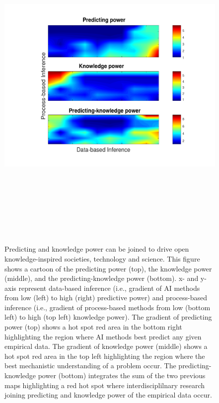 \documentclass[english,12pt]{article}
\begin{document}
\newpage


\begin{figure}
\begin{center}
  \hspace{-0.5 in}\includegraphics[width=16cm,height=16cm]{Figure3.pdf}\\
\end{center}
\vspace{-0.25 in}
\caption{Predicting and knowledge power can be joined to drive open
  knowledge-inspired societies, technology and science. This figure
  shows a cartoon of the predicting power (top), the knowledge power
  (middle), and the predicting-knowledge power (bottom). x- and y-axis
  represent data-based inference (i.e., gradient of AI methods from
  low (left) to high (right) predictive power) and process-based
  inference (i.e., gradient of process-based methods from low (bottom
  left) to high (top left) knowledge power). The gradient of
  predicting power (top) shows a hot spot red area in the bottom right
  highlighting the region where AI methods best predict any given
  empirical data. The gradient of knowledge power (middle) shows a hot
  spot red area in the top left highlighting the region where the best
  mechanistic understanding of a problem occur. The
  predicting-knowledge power (bottom) integrates the sum of the two
  previous maps highlighting a red hot spot where interdisciplilnary
  research joining predicting and knowledge power of the empirical
  data occur.}
\label{}
\end{figure}
\end{document}
